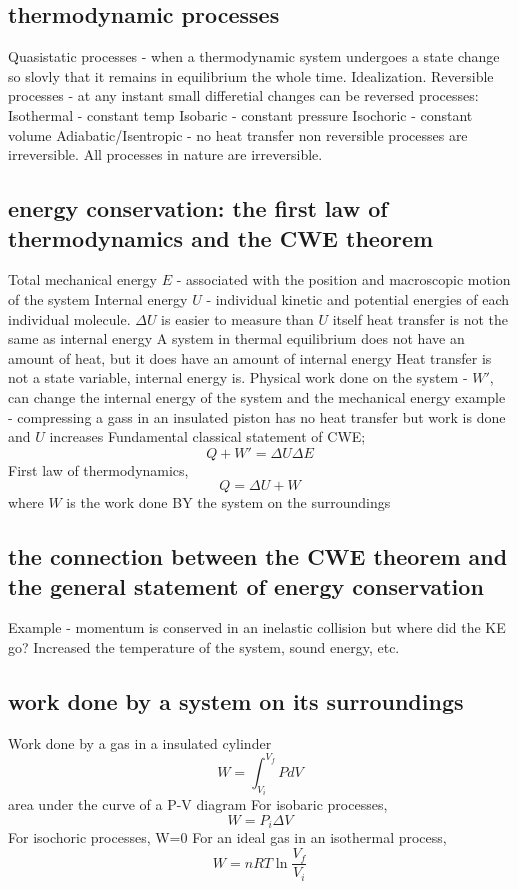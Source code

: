 \documentclass[twocolumn]{article}
\begin{document}
\subsection{thermodynamic processes}
\begin{outline}
\1 Quasistatic processes - when a thermodynamic system undergoes a state change so slovly that it remains in equilibrium the whole time. Idealization.
\1 Reversible processes - at any instant small differetial changes can be reversed
\1 processes:
\2 Isothermal - constant temp
\2 Isobaric - constant pressure
\2 Isochoric - constant volume
\2 Adiabatic/Isentropic - no heat transfer
\1 non reversible processes are irreversible. All processes in nature are irreversible. 
\end{outline}
\subsection{energy conservation: the first law of thermodynamics and the CWE 
theorem}
\begin{outline}
\1 Total mechanical energy $E$ - associated with the position and macroscopic motion of the system
\1 Internal energy $U$ - individual kinetic and potential energies of each individual molecule. 
\2 $\Delta U$ is easier to measure than $U$ itself
\1 heat transfer is not the same as internal energy
\1 A system in thermal equilibrium does not have an amount of heat, but it does have an amount of internal energy
\1 Heat transfer is not a state variable, internal energy is.
\1 Physical work done on the system - $W'$, can change the internal energy of the system and the mechanical energy
\2 example - compressing a gass in an insulated piston has no heat transfer but work is done and $U$ increases
\1 Fundamental classical statement of CWE; \[Q+W'=\Delta U\Delta E\]
\1 First law of thermodynamics, \[Q=\Delta U+W\] where $W$ is the work done BY the system on the surroundings
\end{outline}
\subsection{the connection between the CWE theorem and the general statement of energy conservation}
\begin{outline}
\1 Example - momentum is conserved in an inelastic collision but where did the KE go? Increased the temperature of the system, sound energy, etc.
\end{outline}
\subsection{work done by a system on its surroundings}
\begin{outline}
\1 Work done by a gas in a insulated cylinder \[W=\int_{V_i}^{V_f}PdV\]
\2 area under the curve of a P-V diagram
\1 For isobaric processes, \[W=P_i\Delta V\]
\1 For isochoric processes, W=0
\1 For an ideal gas in an isothermal process, \[W=nRT\ln\dfrac{V_f}{V_i}\]

\end{outline}
\end{document}
